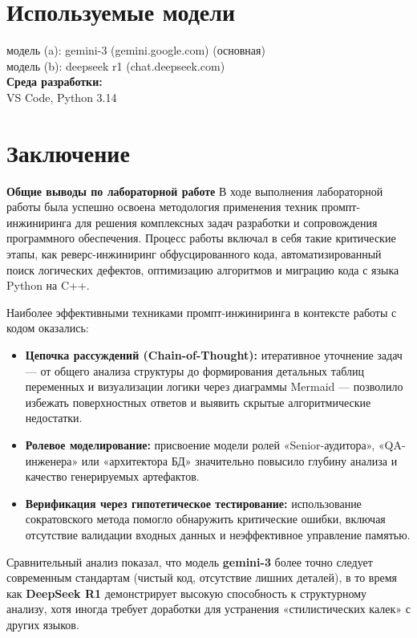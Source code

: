 \documentclass[oneside,a4paper,14pt]{extarticle} %
\begin{document}
	\section*{Используемые модели}
	\noindent
	\indent модель (a): gemini-3 (gemini.google.com) (основная)\\
	\indent модель (b): deepseek r1 (chat.deepseek.com)\\
	\noindent
	\newline
	\textbf{Среда разработки:} \\ 
	\indent VS Code, Python 3.14

	\setcounter{section}{1}
	
	
	
	
	
	
	
	\newpage
	\section*{Заключение}
\textbf{Общие выводы по лабораторной работе}
\newline
В ходе выполнения лабораторной работы была успешно освоена методология применения техник промпт-инжиниринга для решения комплексных задач разработки и сопровождения программного обеспечения. Процесс работы включал в себя такие критические этапы, как реверс-инжиниринг обфусцированного кода, автоматизированный поиск логических дефектов, оптимизацию алгоритмов и миграцию кода с языка Python на C++.

Наиболее эффективными техниками промпт-инжиниринга в контексте работы с кодом оказались:
\begin{itemize}
\item \textbf{Цепочка рассуждений (Chain-of-Thought):} итеративное уточнение задач — от общего анализа структуры до формирования детальных таблиц переменных и визуализации логики через диаграммы Mermaid — позволило избежать поверхностных ответов и выявить скрытые алгоритмические недостатки.
\item \textbf{Ролевое моделирование:} присвоение модели ролей «Senior-аудитора», «QA-инженера» или «архитектора БД» значительно повысило глубину анализа и качество генерируемых артефактов.
\item \textbf{Верификация через гипотетическое тестирование:} использование сократовского метода помогло обнаружить критические ошибки, включая отсутствие валидации входных данных и неэффективное управление памятью.
\end{itemize}
Сравнительный анализ показал, что модель \textbf{gemini-3} более точно следует современным стандартам (чистый код, отсутствие лишних деталей), в то время как \textbf{DeepSeek R1} демонстрирует высокую способность к структурному анализу, хотя иногда требует доработки для устранения «стилистических калек» с других языков.
\end{document}
